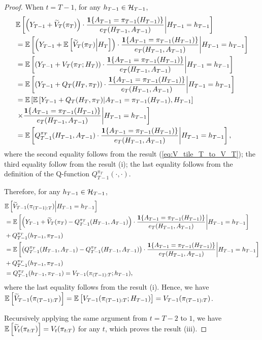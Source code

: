 \begin{proof}
When $t=T-1$, for any $h_{T-1} \in \mathcal{H}_{T-1}$,
\begin{align*}
    &\mathbb{E}\left[\left(Y_{T-1} + \widetilde{V}_{T}(\pi_{T})\right) \cdot \frac{\mathbf{1}\{A_{T-1}=\pi_{T-1}(H_{T-1})\}}{e_{T}(H_{T-1},A_{T-1})} \middle| H_{T-1}=h_{T-1}\right]\\
    &=\mathbb{E}\left[\left(Y_{T-1} + \mathbb{E}\left[\widetilde{V}_{T}(\pi_{T})\middle| H_{T}\right]\right) \cdot \frac{\mathbf{1}\{A_{T-1}=\pi_{T-1}(H_{T-1})\}}{e_{T}(H_{T-1},A_{T-1})} \middle| H_{T-1}=h_{T-1}\right]\\
    &= \mathbb{E}\left[\left(Y_{T-1} + V_{T}(\pi_{T};H_{T})\right) \cdot \frac{\mathbf{1}\{A_{T-1}=\pi_{T-1}(H_{T-1})\}}{e_{T}(H_{T-1},A_{T-1})} \middle| H_{T-1}=h_{T-1}\right]\\
    &= \mathbb{E}\left[\left(Y_{T-1} + Q_{T}(H_{T},\pi_{T})\right) \cdot \frac{\mathbf{1}\{A_{T-1}=\pi_{T-1}(H_{T-1})\}}{e_{T}(H_{T-1},A_{T-1})} \middle| H_{T-1}=h_{T-1}\right]\\
     &= \mathbb{E}\left[\mathbb{E}\left[Y_{T-1} + Q_{T}(H_{T},\pi_{T})\middle| A_{T-1}=\pi_{T-1}(H_{T-1}),H_{T-1}\right]\right.\\
     &\left. \times \frac{\mathbf{1}\{A_{T-1}=\pi_{T-1}(H_{T-1})\}}{e_{T}(H_{T-1},A_{T-1})} \middle| H_{T-1}=h_{T-1}\right]\\
     &= \mathbb{E}\left[Q_{T-1}^{\pi_{T}}(H_{T-1},A_{T-1}) \cdot \frac{\mathbf{1}\{A_{T-1}=\pi_{T-1}(H_{T-1})\}}{e_{T}(H_{T-1},A_{T-1})} \middle| H_{T-1}=h_{T-1}\right],
\end{align*}
where the second equality follows from the result (\ref{eq:V_tile_T_to_V_T}); the third equality follow from the result (i); the last equality follows from the definition of the Q-function $Q_{T-1}^{\pi_T}(\cdot,\cdot)$.

Therefore, for any $h_{T-1} \in \mathcal{H}_{T-1}$,
\begin{align*}
    &\mathbb{E}\left[\widetilde{V}_{T-1}(\pi_{(T-1):T})\middle| H_{T-1} = h_{T-1}\right]\\
    & = \mathbb{E}\left[\left(Y_{T-1} + \widetilde{V}_{T}(\pi_{T}) - Q_{T-1}^{\pi_{T}}(H_{T-1},A_{T-1})\right) \cdot \frac{\mathbf{1}\{A_{T-1}=\pi_{T-1}(H_{T-1})\}}{e_{T}(H_{T-1},A_{T-1})} \middle| H_{T-1}=h_{T-1}\right] \\
    &+ Q_{T-1}^{\pi_{T}}(h_{T-1},\pi_{T-1})\\
    & = \mathbb{E}\left[\left(Q_{T-1}^{\pi_{T}}(H_{T-1},A_{T-1}) - Q_{T-1}^{\pi_{T}}(H_{T-1},A_{T-1})\right) \cdot \frac{\mathbf{1}\{A_{T-1}=\pi_{T-1}(H_{T-1})\}}{e_{T}(H_{T-1},A_{T-1})} \middle| H_{T-1}=h_{T-1}\right] \\
    &+ Q_{T-1}^{\pi_{T}}(h_{T-1},\pi_{T-1})\\
& =  Q_{T-1}^{\pi_{T}}(h_{T-1},\pi_{T-1}) = V_{T-1}(\pi_{(T-1):T};h_{T-1}),
\end{align*}
where the last equality follows from the result (i). Hence, we have $\mathbb{E}\left[\widetilde{V}_{T-1}(\pi_{(T-1):T})\right] = \mathbb{E}\left[V_{T-1}(\pi_{(T-1):T};H_{T-1})\right] = V_{T-1}(\pi_{(T-1):T})$.

Recursively applying the same argument from $t=T-2$ to $1$, we have $\mathbb{E}\left[\widetilde{V}_{t}(\pi_{t:T})\right] = V_{t}(\pi_{t:T})$ for any $t$, which proves the result (iii).
\end{proof}

